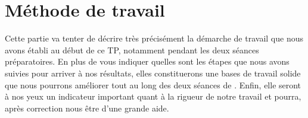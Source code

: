 \section{Méthode de travail}
Cette partie va tenter de décrire très précisément la démarche de travail que nous avons établi au début de ce TP, notamment pendant les deux séances préparatoires. En plus de vous indiquer quelles sont les étapes que nous avons suivies pour arriver à nos résultats, elles constituerons une bases de travail solide que nous pourrons améliorer tout au long des deux séances de . Enfin, elle seront à nos yeux un indicateur important quant à la rigueur de notre travail et pourra, après correction nous être d'une grande aide.

\newpage


\newpage

